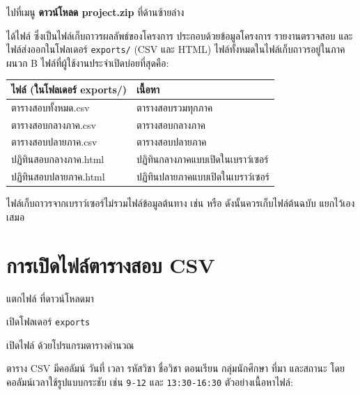 \begin{steps}
  \item ไปที่เมนู \textbf{ดาวน์โหลด project.zip} ที่ด้านซ้ายล่าง
\end{steps}

ได้ไฟล์  ซึ่งเป็นไฟล์เก็บถาวรผลลัพธ์ของโครงการ
ประกอบด้วยข้อมูลโครงการ รายงานตรวจสอบ และไฟล์ส่งออกในโฟลเดอร์
\texttt{exports/} (CSV และ HTML) ไฟล์ทั้งหมดในไฟล์เก็บถาวรอยู่ในภาคผนวก B
ไฟล์ที่ผู้ใช้งานประจำเปิดบ่อยที่สุดคือ:

\begin{center}
\small
\begin{tabular}{L{6.5cm}L{8cm}}
\toprule
\textbf{ไฟล์ (ในโฟลเดอร์ exports/)} & \textbf{เนื้อหา} \\
\midrule
ตารางสอบทั้งหมด.csv & ตารางสอบรวมทุกภาค \\
ตารางสอบกลางภาค.csv & ตารางสอบกลางภาค \\
ตารางสอบปลายภาค.csv & ตารางสอบปลายภาค \\
ปฏิทินสอบกลางภาค.html & ปฏิทินกลางภาคแบบเปิดในเบราว์เซอร์ \\
ปฏิทินสอบปลายภาค.html & ปฏิทินปลายภาคแบบเปิดในเบราว์เซอร์ \\
\bottomrule
\end{tabular}
\end{center}

\begin{caution}
ไฟล์เก็บถาวรจากเบราว์เซอร์ไม่รวมไฟล์ข้อมูลต้นทาง เช่น
 หรือ  ดังนั้นควรเก็บไฟล์ต้นฉบับ
แยกไว้เองเสมอ
\end{caution}

\section{การเปิดไฟล์ตารางสอบ CSV}

\begin{steps}
  \item แตกไฟล์  ที่ดาวน์โหลดมา
  \item เปิดโฟลเดอร์ \texttt{exports}
  \item เปิดไฟล์  ด้วยโปรแกรมตารางคำนวณ
\end{steps}

ตาราง CSV มีคอลัมน์ วันที่ เวลา รหัสวิชา ชื่อวิชา ตอนเรียน กลุ่มนักศึกษา
ที่มา และสถานะ โดยคอลัมน์เวลาใช้รูปแบบกระชับ
เช่น \texttt{9-12} และ \texttt{13:30-16:30} ตัวอย่างเนื้อหาไฟล์:

